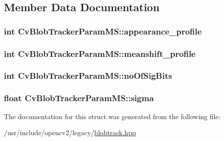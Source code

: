 \subsection{Member Data Documentation}
\hypertarget{structCvBlobTrackerParamMS_ad9ab9608d3ef544322d0b8a974f9a500}{
\subsubsection[{appearance\-\_\-profile}]{\setlength{\rightskip}{0pt plus 5cm}int Cv\-Blob\-Tracker\-Param\-M\-S\-::appearance\-\_\-profile}}\label{structCvBlobTrackerParamMS_ad9ab9608d3ef544322d0b8a974f9a500}
\hypertarget{structCvBlobTrackerParamMS_a0016636f94ba7c0cf4410853b438a19b}{
\subsubsection[{meanshift\-\_\-profile}]{\setlength{\rightskip}{0pt plus 5cm}int Cv\-Blob\-Tracker\-Param\-M\-S\-::meanshift\-\_\-profile}}\label{structCvBlobTrackerParamMS_a0016636f94ba7c0cf4410853b438a19b}
\hypertarget{structCvBlobTrackerParamMS_a7ec209dff925965070ee6b7add5f3f57}{
\subsubsection[{no\-Of\-Sig\-Bits}]{\setlength{\rightskip}{0pt plus 5cm}int Cv\-Blob\-Tracker\-Param\-M\-S\-::no\-Of\-Sig\-Bits}}\label{structCvBlobTrackerParamMS_a7ec209dff925965070ee6b7add5f3f57}
\hypertarget{structCvBlobTrackerParamMS_a7d7129795980412c56f32eb15a54b0b0}{
\subsubsection[{sigma}]{\setlength{\rightskip}{0pt plus 5cm}float Cv\-Blob\-Tracker\-Param\-M\-S\-::sigma}}\label{structCvBlobTrackerParamMS_a7d7129795980412c56f32eb15a54b0b0}


The documentation for this struct was generated from the following file\-:\begin{DoxyCompactItemize}
\item 
/usr/include/opencv2/legacy/\hyperlink{blobtrack_8hpp}{blobtrack.\-hpp}\end{DoxyCompactItemize}
